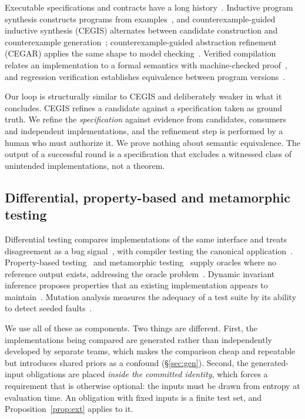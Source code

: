 \documentclass[10pt,twocolumn]{article}
\begin{document}
Executable specifications and contracts have a long
history~\cite{meyer1992,jackson2002}. Inductive program synthesis
constructs programs from examples~\cite{gulwani2011}, and
counterexample-guided inductive synthesis (CEGIS) alternates between
candidate construction and counterexample
generation~\cite{solarlezama2006,alur2013}; counterexample-guided
abstraction refinement (CEGAR) applies the same shape to model
checking~\cite{clarke2000}. Verified compilation relates an
implementation to a formal semantics with machine-checked
proof~\cite{leroy2006,kumar2014}, and regression verification establishes
equivalence between program versions~\cite{godlin2009}.

Our loop is structurally similar to CEGIS and deliberately weaker in what
it concludes. CEGIS refines a candidate against a specification taken as
ground truth. We refine the \emph{specification} against evidence from
candidates, consumers and independent implementations, and the refinement
step is performed by a human who must authorize it. We prove nothing
about semantic equivalence. The output of a successful round is a
specification that excludes a witnessed class of unintended
implementations, not a theorem.

\subsection{Differential, property-based and metamorphic testing}

Differential testing compares implementations of the same interface and
treats disagreement as a bug signal~\cite{mckeeman1998}, with compiler
testing the canonical application~\cite{yang2011}. Property-based
testing~\cite{claessen2000} and metamorphic
testing~\cite{chen1998,segura2016} supply oracles where no reference
output exists, addressing the oracle problem~\cite{barr2015}. Dynamic
invariant inference proposes properties that an existing implementation
appears to maintain~\cite{ernst2007}. Mutation analysis measures the
adequacy of a test suite by its ability to detect seeded
faults~\cite{demillo1978,jia2011}.

We use all of these as components. Two things are different. First, the
implementations being compared are generated rather than independently
developed by separate teams, which makes the comparison cheap and
repeatable but introduces shared priors as a confound (\S\ref{sec:gen}).
Second, the generated-input obligations are placed \emph{inside the
committed identity}, which forces a requirement that is otherwise
optional: the inputs must be drawn from entropy at evaluation time. An
obligation with fixed inputs is a finite test set, and
Proposition~\ref{prop:ext} applies to it.
\end{document}

